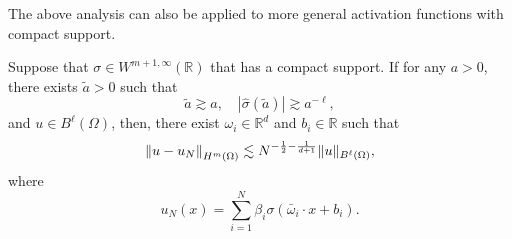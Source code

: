 The above analysis can also be applied to more general activation functions with compact support. 
\begin{theorem}
Suppose that $\sigma\in W^{m+1,\infty}(\mathbb{R})$ that has a compact
support. If for any $a>0$, there exists $\tilde a>0$ such that
\begin{equation}
\tilde a\gtrsim a,\quad  |\hat\sigma(\tilde a)|\gtrsim a^{-\ell},
\end{equation}
and  $u\in {B}^{\ell}(\Omega)$, then, there exist $\omega_i\in \mathbb{R}^d$ and $b_i\in \mathbb{R}$ such that
\begin{equation}
\left\|u - u_{N}\right\|_{H^{m}(\Omega)}\lesssim  N^{-{1\over 2}-{1\over d+1}} \|u\|_{B^{\ell}(\Omega)},
\end{equation}
where
\begin{equation}
u_{N}(x)=\sum_{i=1}^{N} \beta_i \sigma\left(\bar \omega_i\cdot x+b_i\right) .
\end{equation} 
\end{theorem}

\fi
